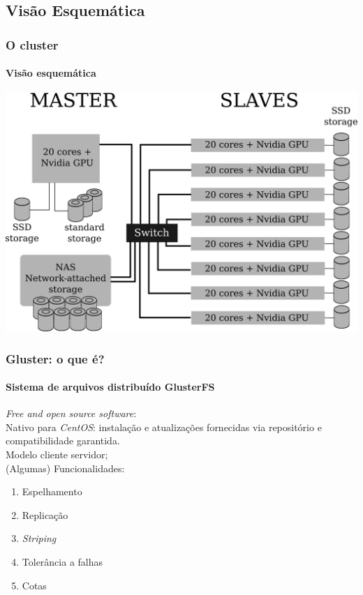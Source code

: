 \documentclass[svgnames,smaller,table]{beamer}
\begin{document}
\subsection{Visão Esquemática}
\begin{frame}[noframenumbering]
  \frametitle{O cluster}
  \framesubtitle{Visão esquemática}
  \begin{center}
    \includegraphics[scale=0.5]{figuras/cluster-topologico.png}
  \end{center}
\end{frame}

\begin{frame}
  \frametitle{Gluster: o que é?}
  \framesubtitle{Sistema de arquivos distribuído \textbf{GlusterFS}}

\textbullet  \textit{Free and open source software}:\\%
\textbullet  Nativo para \textit{CentOS}: instalação e atualizações fornecidas via repositório e compatibilidade garantida.\\
\textbullet  Modelo cliente servidor;\\
  \vspace{0.2cm}
  (Algumas) Funcionalidades:

  \begin{enumerate}
  \item Espelhamento
  \item Replicação
  \item \textit{Striping}
  \item Tolerância a falhas
  \item Cotas
  \end{enumerate}

\end{frame}
\end{document}
